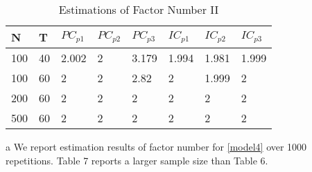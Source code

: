 \documentclass[a4paper]{article}
\begin{document}
\begin{table}[]
\caption{\centering Estimations of Factor Number  II}
\label{table:table7}
\centering

\begin{threeparttable}

\begin{tabular}{l|l|l|l|l|l|l|l}
\hline
N   & T  & $PC_{p1}$ & $PC_{p2}$ & $PC_{p3}$ & $IC_{p1}$ & $IC_{p2}$ & $IC_{p3}$   \\ \hline
100 & 40 & 2.002 & 2   & 3.179 & 1.994 & 1.981 & 1.999 \\ \hline
100 & 60 & 2     & 2   & 2.82  & 2     & 1.999 & 2     \\ \hline
200 & 60 & 2     & 2   & 2     & 2     & 2     & 2     \\ \hline
500 & 60 & 2     & 2   & 2     & 2     & 2     & 2     \\ \hline
\end{tabular}

\begin{tablenotes}
        \footnotesize
        \item[a]  We report estimation results of factor number for \eqref{model4} over 1000 repetitions. Table 7 reports a larger sample size than Table 6.
      \end{tablenotes}
\end{threeparttable}

\end{table}
\end{document}
